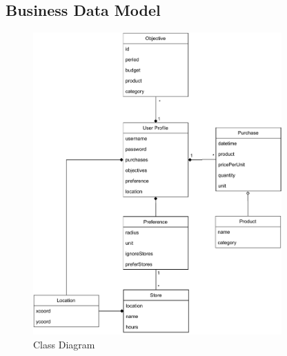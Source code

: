 \documentclass[12pt]{article}
\begin{document}
\subsection{Business Data Model}
\begin{figure}[H]
    \centering
    \includegraphics[width=0.85\textwidth]{classdiagram}
    \caption{Class Diagram}
    \label{fig:classdiagram}
\end{figure}
\end{document}
